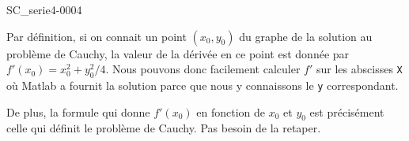\begin{corrige}{SC_serie4-0004}

	Par définition, si on connait un point $(x_0,y_0)$ du graphe de la solution au problème de Cauchy, la valeur de la dérivée en ce point est donnée par $f'(x_0)=x_0^2+y_0^2/4$. Nous pouvons donc facilement calculer $f'$ sur les abscisses \verb+X+ où Matlab a fournit la solution parce que nous y connaissons le \verb+y+ correspondant.

	De plus, la formule qui donne $f'(x_0)$ en fonction de $x_0$ et $y_0$ est précisément celle qui définit le problème de Cauchy. Pas besoin de la retaper.



\end{corrige}
